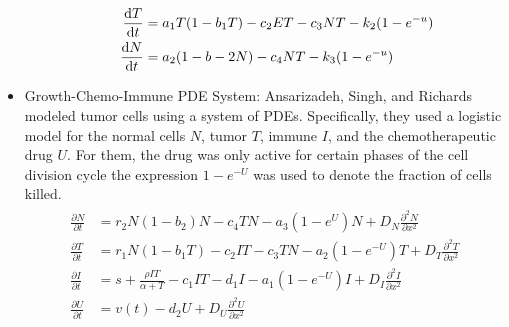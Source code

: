 \documentclass[11pt]{amsart}
\begin{document}
\begin{itemize}
\begin{itemize}
				\begin{eqnarray}
					\begin{aligned}
						\frac{\mathop{}\!\mathrm{d} T}{\mathop{}\!\mathrm{d} t} &= a_1T(1-b_1T) - c_2ET - c_3NT - k_2(1-e^{-u}) \\
						\frac{\mathop{}\!\mathrm{d} N}{\mathop{}\!\mathrm{d} t} &= a_2(1-b-2N) - c_4NT - k_3 (1-e^{-u})\label{eq: dePillisTumorImmuno}
					\end{aligned}
				\end{eqnarray}
		\end{itemize}
	\item Growth-Chemo-Immune PDE System: Ansarizadeh, Singh, and Richards modeled tumor cells using a system of PDEs. Specifically, they used a logistic model for the normal cells $N$, tumor $T$, immune $I$, and the chemotherapeutic drug $U$. For them, the drug was only active for certain phases of the cell division cycle the expression $1-e^{-U}$ was used to denote the fraction of cells killed.
		\begin{eqnarray}
			\begin{aligned}
				\frac{\partial N}{\partial t} &= r_2 N (1-b_2)N - c_4TN - a_3(1-e^U)N + D_N \frac{\partial^2 N }{\partial x^2} \\
				\frac{\partial T}{\partial t} &= r_1 N (1-b_1 T) - c_2 IT - c_3TN - a_2(1-e^{-U})T + D_T \frac{\partial^2 T }{\partial x^2} \\
				\frac{\partial I}{\partial t} &= s + \frac{\rho IT}{\alpha + T} - c_1 IT - d_1 I - a_1(1-e^{-U})I +D_I \frac{\partial^2 I }{\partial x^2} \\
				\frac{\partial U}{\partial t} &= v(t) -d_2U + D_U \frac{\partial^2 U}{\partial x^2}\label{eq:GrowthChemoImmunoPDE}
			\end{aligned}
		\end{eqnarray}
\end{itemize}


\newpage

\nocite{*}
\end{document}
